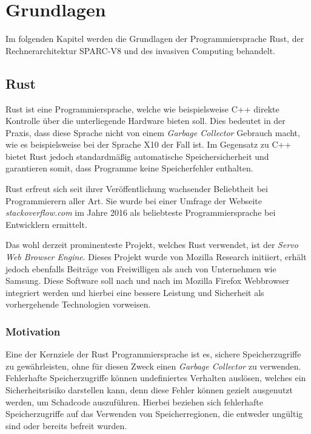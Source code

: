 \chapter{Grundlagen}\label{sec:basics}

Im folgenden Kapitel werden die Grundlagen der Programmiersprache Rust, der Rechnerarchitektur SPARC-V8 und des 
invasiven Computing behandelt.

\section{Rust}

Rust ist eine Programmiersprache, welche wie beispielsweise C++ direkte Kontrolle über die
unterliegende Hardware bieten soll. Dies bedeutet in der Praxis, dass diese Sprache nicht von einem
\textit{Garbage Collector} Gebrauch macht, wie es beispielsweise bei der Sprache X10 der Fall ist.
Im Gegensatz zu C++ bietet Rust jedoch
standardmäßig automatische Speichersicherheit und garantieren somit, dass Programme keine Speicherfehler enthalten.
\cite{theRustLanguage}

Rust erfreut sich seit ihrer Veröffentlichung wachsender Beliebtheit bei Programmierern aller Art. Sie wurde
bei einer Umfrage der Webseite \textit{stackoverflow.com} im Jahre 2016 als beliebteste Programmiersprache bei 
Entwicklern ermittelt\cite{stackoverflowSurvey}.

Das wohl derzeit prominenteste Projekt, welches Rust verwendet, ist der \textit{Servo Web Browser Engine}.
Dieses Projekt wurde von Mozilla Research initiiert, erhält jedoch ebenfalls Beiträge von Freiwilligen
als auch von Unternehmen wie Samsung.
Diese Software soll nach und nach im Mozilla Firefox Webbrowser integriert werden und hierbei eine bessere
Leistung und Sicherheit als vorhergehende Technologien vorweisen\cite{engineeringServo}.

\subsection{Motivation}

Eine der Kernziele der Rust Programmiersprache ist es, sichere Speicherzugriffe zu gewährleisten, ohne
für diesen Zweck einen \textit{Garbage Collector} zu verwenden. Fehlerhafte Speicherzugriffe können undefiniertes
Verhalten auslösen, welches ein Sicherheitsrisiko darstellen kann, denn diese Fehler können gezielt ausgenutzt
werden, um Schadcode auszuführen. Hierbei beziehen sich fehlerhafte Speicherzugriffe auf das Verwenden von 
Speicherregionen, die entweder ungültig sind oder bereits befreit wurden.
\cite{engineeringServo}\cite{undefinedBehaviour}


